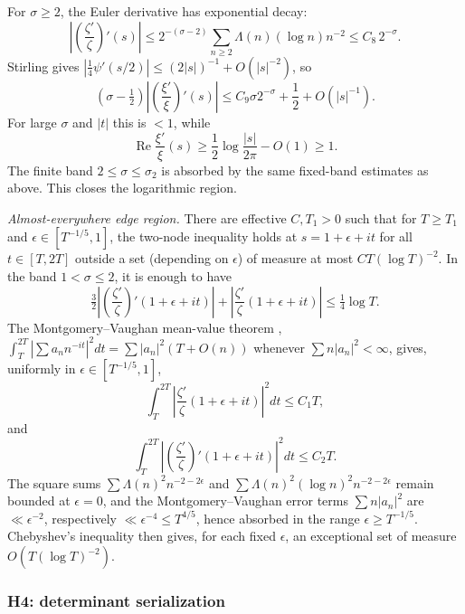 \documentclass[11pt]{amsart}
\theoremstyle{definition}
\theoremstyle{remark}
\theoremstyle{definition}
\renewcommand{\Re}{\operatorname{Re}}
\newcommand{\half}{\tfrac{1}{2}}
\begin{document}
For $\sigma\ge2$, the Euler derivative has exponential decay:
\[
   \left|\left(\frac{\zeta'}{\zeta}\right)'(s)\right|
   \le
   2^{-(\sigma-2)}\sum_{n\ge2}\Lambda(n)(\log n)n^{-2}
   \le C_8\,2^{-\sigma}.
\]
Stirling gives $|\frac14\psi'(s/2)|\le(2|s|)^{-1}+O(|s|^{-2})$, so
\[
   \left(\sigma-\half\right)
   \left|\left(\frac{\xi'}{\xi}\right)'(s)\right|
   \le C_9\sigma2^{-\sigma}+\frac12+O(|s|^{-1}).
\]
For large $\sigma$ and $|t|$ this is $<1$, while
\[
   \Re\frac{\xi'}{\xi}(s)\ge\frac12\log\frac{|s|}{2\pi}-O(1)\ge1.
\]
The finite band $2\le\sigma\le\sigma_2$ is absorbed by the same fixed-band estimates as above.  This
closes the logarithmic region.

\emph{Almost-everywhere edge region.}  There are effective $C,T_1>0$ such that for
$T\ge T_1$ and $\epsilon\in[T^{-1/5},1]$, the two-node inequality holds at
$s=1+\epsilon+it$ for all $t\in[T,2T]$ outside a set (depending on $\epsilon$) of measure at most
$CT(\log T)^{-2}$.  In the band $1<\sigma\le2$, it is enough to have
\[
   \tfrac32\left|\left(\frac{\zeta'}{\zeta}\right)'(1+\epsilon+it)\right|
   +
   \left|\frac{\zeta'}{\zeta}(1+\epsilon+it)\right|
   \le \tfrac14\log T.
\]
The Montgomery--Vaughan mean-value theorem \cite{MontgomeryVaughanMVT},
$\int_T^{2T}|\sum a_nn^{-it}|^2dt=\sum|a_n|^2(T+O(n))$ whenever $\sum n|a_n|^2<\infty$, gives, uniformly in
$\epsilon\in[T^{-1/5},1]$,
\[
   \int_T^{2T}\left|\frac{\zeta'}{\zeta}(1+\epsilon+it)\right|^2dt\le C_1T,
\]
and
\[
   \int_T^{2T}
   \left|\left(\frac{\zeta'}{\zeta}\right)'(1+\epsilon+it)\right|^2dt\le C_2T.
\]
The square sums
$\sum\Lambda(n)^2n^{-2-2\epsilon}$ and
$\sum\Lambda(n)^2(\log n)^2n^{-2-2\epsilon}$ remain bounded at $\epsilon=0$, and the
Montgomery--Vaughan error terms $\sum n|a_n|^2$ are $\ll\epsilon^{-2}$, respectively
$\ll\epsilon^{-4}\le T^{4/5}$, hence absorbed in the range $\epsilon\ge T^{-1/5}$.  Chebyshev's
inequality then gives, for each fixed $\epsilon$, an exceptional set of measure $O(T(\log T)^{-2})$.

\subsubsection*{H4: determinant serialization}
\end{document}
